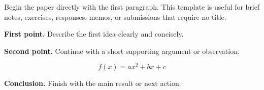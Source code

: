 \documentclass[11pt,a4paper]{article}
\begin{document}
Begin the paper directly with the first paragraph. This template is useful for
brief notes, exercises, responses, memos, or submissions that require no title.

\textbf{\textcolor{LrssnPrimaryText}{First point.}}
Describe the first idea clearly and concisely.

\textbf{\textcolor{LrssnSecondaryText}{Second point.}}
Continue with a short supporting argument or observation.

\[
    f(x) = ax^2 + bx + c
\]

\textbf{\textcolor{LrssnPrimaryText}{Conclusion.}}
Finish with the main result or next action.
\end{document}
